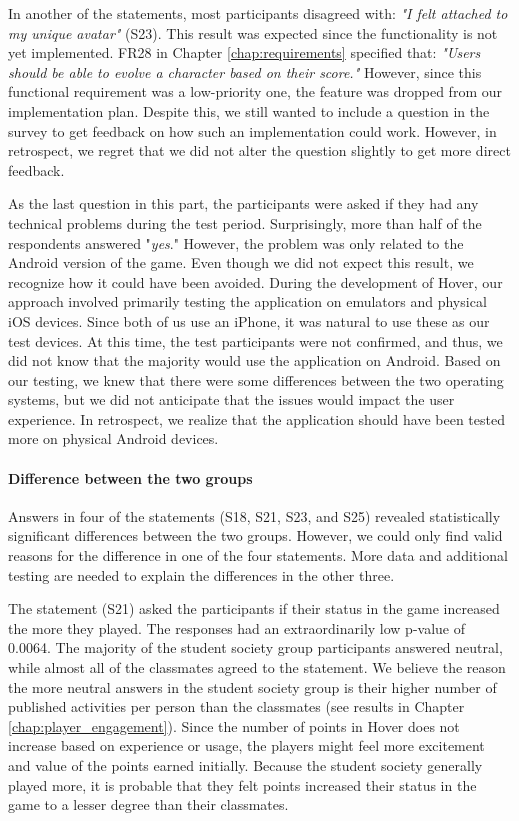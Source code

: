 In another of the statements, most participants disagreed with: \textit{"I felt attached to my unique avatar"} (S23). This result was expected since the functionality is not yet implemented. FR28 in Chapter \ref{chap:requirements} specified that: \textit{"Users should be able to evolve a character based on their score."} However, since this functional requirement was a low-priority one, the feature was dropped from our implementation plan. Despite this, we still wanted to include a question in the survey to get feedback on how such an implementation could work. However, in retrospect, we regret that we did not alter the question slightly to get more direct feedback.

As the last question in this part, the participants were asked if they had any technical problems during the test period. Surprisingly, more than half of the respondents answered "\textit{yes}." However, the problem was only related to the Android version of the game. Even though we did not expect this result, we recognize how it could have been avoided. During the development of Hover, our approach involved primarily testing the application on emulators and physical iOS devices. Since both of us use an iPhone, it was natural to use these as our test devices. At this time, the test participants were not confirmed, and thus, we did not know that the majority would use the application on Android. Based on our testing, we knew that there were some differences between the two operating systems, but we did not anticipate that the issues would impact the user experience. In retrospect, we realize that the application should have been tested more on physical Android devices.

\paragraph*{Difference between the two groups} 
Answers in four of the statements (S18, S21, S23, and S25) revealed statistically significant differences between the two groups. However, we could only find valid reasons for the difference in one of the four statements. More data and additional testing are needed to explain the differences in the other three.

The statement (S21) asked the participants if their status in the game increased the more they played. The responses had an extraordinarily low p-value of 0.0064. The majority of the student society group participants answered neutral, while almost all of the classmates agreed to the statement. We believe the reason the more neutral answers in the student society group is their higher number of published activities per person than the classmates (see results in Chapter \ref{chap:player_engagement}). Since the number of points in Hover does not increase based on experience or usage, the players might feel more excitement and value of the points earned initially. Because the student society generally played more, it is probable that they felt points increased their status in the game to a lesser degree than their classmates.

